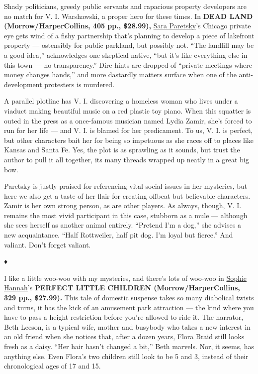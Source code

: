 Shady politicians, greedy public servants and rapacious property
developers are no match for V. I. Warshawski, a proper hero for these
times. In \textbf{DEAD LAND (Morrow/HarperCollins, 405 pp., \$28.99),}
\href{https://www.nytimes3xbfgragh.onion/2014/09/14/books/review/sara-paretsky-by-the-book.html}{Sara
Paretsky}'s Chicago private eye gets wind of a fishy partnership that's
planning to develop a piece of lakefront property --- ostensibly for
public parkland, but possibly not. ``The landfill may be a good idea,''
acknowledges one skeptical native, ``but it's like everything else in
this town --- no transparency.'' Dire hints are dropped of ``private
meetings where money changes hands,'' and more dastardly matters surface
when one of the anti-development protesters is murdered.

A parallel plotline has V. I. discovering a homeless woman who lives
under a viaduct making beautiful music on a red plastic toy piano. When
this squatter is outed in the press as a once-famous musician named
Lydia Zamir, she's forced to run for her life --- and V. I. is blamed
for her predicament. To us, V. I. is perfect, but other characters bait
her for being so impetuous as she races off to places like Kansas and
Santa Fe. Yes, the plot is as sprawling as it sounds, but trust the
author to pull it all together, its many threads wrapped up neatly in a
great big bow.

Paretsky is justly praised for referencing vital social issues in her
mysteries, but here we also get a taste of her flair for creating
offbeat but believable characters. Zamir is her own strong person, as
are other players. As always, though, V. I. remains the most vivid
participant in this case, stubborn as a mule --- although she sees
herself as another animal entirely. ``Pretend I'm a dog,'' she advises a
new acquaintance. ``Half Rottweiler, half pit dog. I'm loyal but
fierce.'' And valiant. Don't forget valiant.

♦

I like a little woo-woo with my mysteries, and there's lots of woo-woo
in
\href{https://www.nytimes3xbfgragh.onion/2018/08/02/books/review/sophie-hannah-by-the-book.html}{Sophie
Hannah}'s \textbf{PERFECT LITTLE CHILDREN (Morrow/HarperCollins, 329
pp., \$27.99).} This tale of domestic suspense takes so many diabolical
twists and turns, it has the kick of an amusement park attraction ---
the kind where you have to pass a height restriction before you're
allowed to ride it. The narrator, Beth Leeson, is a typical wife, mother
and busybody who takes a new interest in an old friend when she notices
that, after a dozen years, Flora Braid still looks fresh as a daisy.
``Her hair hasn't changed a bit,'' Beth marvels. Nor, it seems, has
anything else. Even Flora's two children still look to be 5 and 3,
instead of their chronological ages of 17 and 15.

